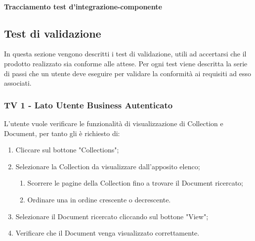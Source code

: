 \vspace{5cm}

\paragraph{Tracciamento test d'integrazione-componente}


\subsection{Test di validazione}
In questa sezione vengono descritti i test di validazione, utili ad accertarsi che il prodotto realizzato sia conforme alle attese.
Per ogni test viene descritta la serie di passi che un utente deve eseguire per validare la conformità ai requisiti ad esso associati.

\subsubsection{TV 1 - Lato Utente Business Autenticato}

L'utente vuole verificare le funzionalità di visualizzazione di Collection e Document, per tanto gli è richiesto di:


\begin{enumerate}
\item Cliccare sul bottone "Collections";
\item Selezionare la Collection da visualizzare dall'apposito elenco;
\begin{enumerate}
\item Scorrere le pagine della Collection fino a trovare il Document ricercato;
\item Ordinare una  in ordine crescente o decrescente.
\end{enumerate}
\item Selezionare il Document ricercato cliccando sul bottone "View";
\item Verificare che il Document venga visualizzato correttamente.
\end{enumerate}

